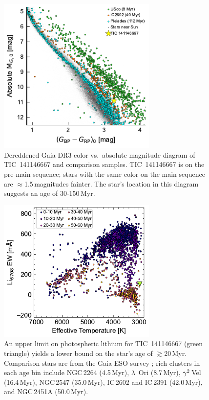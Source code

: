 \documentclass{nature3}
\begin{document}
\begin{methods}
\begin{figure}[!t]
  \centering
  \includegraphics[width=0.7\textwidth]{figures/sf3.pdf}
  \caption{Dereddened Gaia DR3 color vs.~absolute magnitude diagram of
  TIC~141146667 and comparison samples. 
  TIC~141146667 is on the pre-main sequence; stars with the same color
  on the main sequence are $\approx$1.5\,magnitudes
  fainter.  The star's location in this diagram suggests an
  age of 30-150\,Myr.  }
  \label{fig:camd}
\end{figure}


\begin{figure}[!t]
  \centering
  \includegraphics[width=0.7\textwidth]{figures/sf2.pdf}
  \caption{An upper limit on photospheric lithium for TIC~141146667
  (green triangle) yields a lower bound on the star's age of
  $\gtrsim$20\,Myr.  Comparison stars are from the Gaia-ESO survey
  \cite{Jeffries2023}; rich clusters in each age bin include NGC\,2264
  (4.5\,Myr), $\lambda$~Ori (8.7\,Myr), ${\rm \gamma}^2$\,Vel
  (16.4\,Myr), NGC\,2547 (35.0\,Myr), IC\,2602 and IC\,2391 (42.0\,Myr),
  and NGC\,2451A (50.0\,Myr). }
  \label{fig:liew_population}
\end{figure}



\end{methods}
\end{document}
